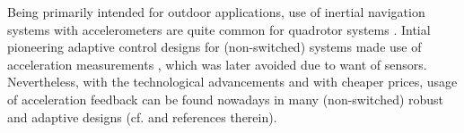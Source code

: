 \begin{remark}
	Being primarily intended for outdoor applications, use of inertial navigation
	systems with accelerometers are quite common for quadrotor systems \cite{ha2014passivity, lee2012experimental}. %
	Intial pioneering adaptive control designs for (non-switched) systems made use of acceleration measurements \cite{spong1990adaptive}, which was later avoided due to want of sensors. Nevertheless, with the technological advancements and with cheaper prices, usage of acceleration feedback can be found nowadays in many (non-switched) robust and adaptive designs (cf. \cite{roy2019, roy2017adaptive, roy2020adaptive, cst_new} and references therein). 
	

\end{remark}
